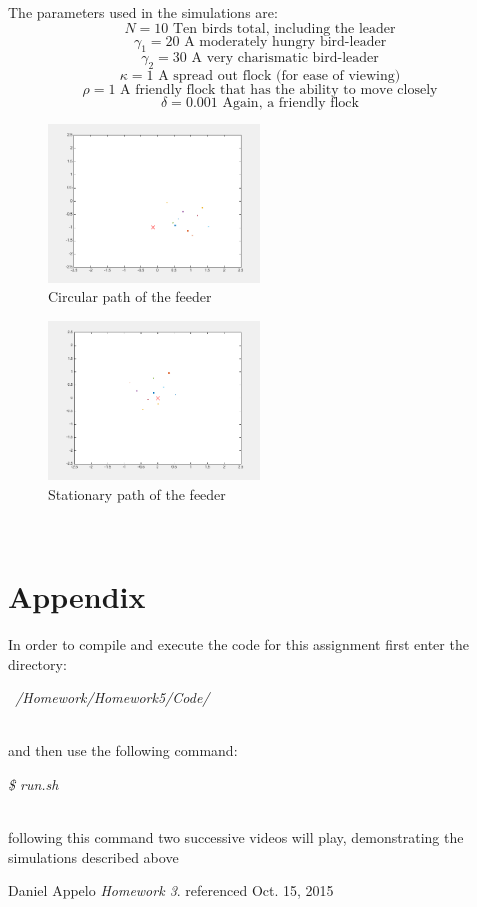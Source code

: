 \documentclass[12pt]{article}
\theoremstyle{definition}
\theoremstyle{definition}
\begin{document}
The parameters used in the simulations are:
\[N=10\text{ Ten birds total, including the leader}\]
\[\gamma_{1}=20\text{ A moderately hungry bird-leader}\]
\[\gamma_{2}=30\text{ A very charismatic bird-leader}\]
\[\kappa=1\text{ A spread out flock (for ease of viewing)}\]
\[\rho=1\text{ A friendly flock that has the ability to move closely}\]
\[\delta=0.001\text{ Again, a friendly flock}\]
\newpage
\begin{figure}[h]
\caption{Circular path of the feeder}
\centering
\includegraphics[width=0.5\textwidth]{trial1}
\end{figure}
\begin{figure}[h]
\caption{Stationary path of the feeder}
\centering
\includegraphics[width=0.5\textwidth]{trial2}
\end{figure}
\\
\newpage
\section{Appendix}
\indent In order to compile and execute the code for this assignment first enter the directory:
\\
\begin{center}
\textit{~/Homework/Homework5/Code/}
\end{center}
\\
and then use the following command:
\\
\begin{center}
\textit{\$ run.sh}
\end{center}
\\
following this command two successive videos will play, demonstrating the simulations described above

\newpage
\begin{thebibliography}{9}
Daniel Appelo
\textit{Homework 3}. 
referenced Oct. 15, 2015

\end{thebibliography}
\end{document}
